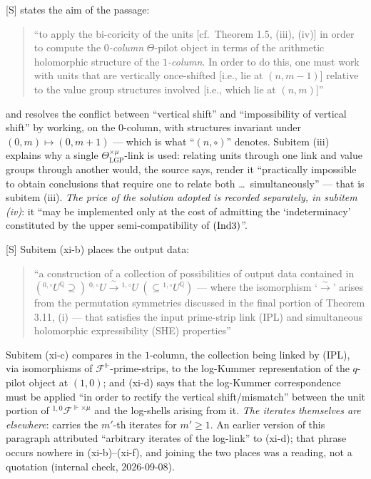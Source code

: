 \documentclass[11pt]{article}
\theoremstyle{plain}
\theoremstyle{definition}
\newcommand{\Ind}[1]{\textup{(Ind#1)}}
\begin{document}
\textup{[S]} \cite[Cor.~3.12, proof, (iv)]{IUT3} states the aim of the passage:
\begin{quote}
``to apply the bi-coricity of the units [cf.\ Theorem 1.5, (iii), (iv)] in order to
compute the \emph{$0$-column} $\Theta$-pilot object in terms of the arithmetic
holomorphic structure of the \emph{$1$-column}.  In order to do this, one must work
with units that are vertically once-shifted [i.e., lie at $(n,m-1)$] relative to the
value group structures involved [i.e., which lie at $(n,m)$]''
\end{quote}
and resolves the conflict between ``vertical shift'' and ``impossibility of vertical
shift'' by working, on the $0$-column, with structures invariant under
$(0,m)\mapsto(0,m+1)$ --- which is what ``$(n,\circ)$'' denotes.  Subitem (iii)
explains why a single $\Theta^{\times\mu}_{\mathrm{LGP}}$-link is used: relating
units through one link and value groups through another would, the source says,
render it ``practically impossible to obtain conclusions that require one to relate
both \dots\ simultaneously'' --- that is subitem (iii).  \emph{The price of the
solution adopted is recorded separately, in subitem (iv)}: it ``may be implemented only
at the cost of admitting the `indeterminacy' constituted by the upper
semi-compatibility of $\Ind3$''.

\textup{[S]} Subitem (xi-b) places the output data:
\begin{quote}
``a construction of a collection of possibilities of output data contained in
$({}^{0,\circ}U^{\mathbb Q}\supseteq)\ {}^{0,\circ}U\xrightarrow{\ \sim\ }
{}^{1,\circ}U\ (\subseteq{}^{1,\circ}U^{\mathbb Q})$ --- where the isomorphism
`$\xrightarrow{\sim}$' arises from the permutation symmetries discussed in the final
portion of Theorem 3.11, (i) --- that satisfies the input prime-strip link (IPL) and
simultaneous holomorphic expressibility (SHE) properties''
\end{quote}
Subitem (xi-c) compares in the $1$-column, the collection being linked by (IPL), via
isomorphisms of $\mathcal F^\Vdash$-prime-strips, to the log-Kummer representation of
the $q$-pilot object at $(1,0)$; and (xi-d) says that the log-Kummer correspondence
must be applied ``in order to rectify the vertical shift/mismatch'' between the unit
portion of ${}^{1,0}\mathcal F^{\Vdash\times\mu}$ and the log-shells arising from it.
\emph{The iterates themselves are elsewhere}: \cite[Prop.~3.5(ii)(a)(2)]{IUT3} carries
the $m'$-th iterates for $m'\ge1$.  An earlier version of this paragraph attributed
``arbitrary iterates of the log-link'' to (xi-d); that phrase occurs nowhere in
(xi-b)--(xi-f), and joining the two places was a reading, not a quotation (internal check, 2026-09-08).
\end{document}
